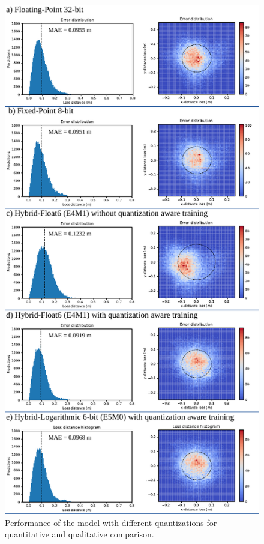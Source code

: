 \begin{figure}[h!]
	\centering
	\includegraphics[width=\columnwidth]{../figures/histograms/model_evaluation.pdf}
	\caption{Performance of the model with different quantizations for quantitative and qualitative comparison.}
	\label{fig:model_evaluation}
\end{figure}


